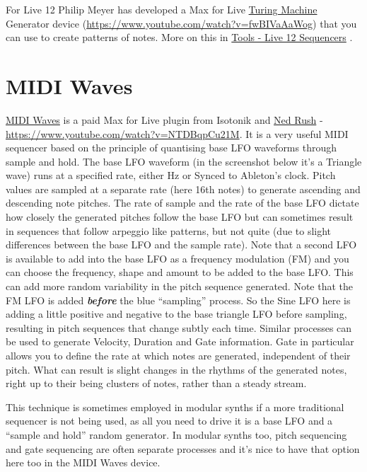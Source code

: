 \documentclass[
  12pt,
  letterpaper,
  oneside,
  open=any]{scrbook}
\makeatletter
\newcommand*\pandocbounded[1]{%
  \sbox\pandoc@box{#1}%
  \Gscale@div\@tempa{\textheight}{\dimexpr\ht\pandoc@box+\dp\pandoc@box\relax}%
  \Gscale@div\@tempb{\linewidth}{\wd\pandoc@box}%
  \ifdim\@tempb\p@<\@tempa\p@\let\@tempa\@tempb\fi%
  \ifdim\@tempa\p@<\p@\scalebox{\@tempa}{\usebox\pandoc@box}%
  \else\usebox{\pandoc@box}%
  \fi%
}
\makeatother
\begin{document}
\pandocbounded{\texttt{[image: images/Turing\_Machine.png]}}

For Live 12 Philip Meyer has developed a Max for Live
\href{https://isotonikstudios.com/product/turing-machine/?srsltid=AfmBOor_T0esjLa-jI_hMBqYTUuz_1TAYSXRbD5u_57BQk_dJ-Yr4ZTt}{Turing
Machine} Generator device
(\url{https://www.youtube.com/watch?v=fwBIVaAaWog}) that you can use to
create patterns of notes. More on this in
\hyperref[Chapter-031-Tools-Live12_Sequencers]{Tools - Live 12
Sequencers} .

\section{MIDI Waves}\label{midi-waves}

\href{https://isotonikstudios.com/product/midi-waves-by-ned-rush/}{MIDI
Waves} is a paid Max for Live plugin from Isotonik and
\href{https://www.youtube.com/@NedRush}{Ned Rush} -
\url{https://www.youtube.com/watch?v=NTDBqpCu21M}. It is a very useful
MIDI sequencer based on the principle of quantising base LFO waveforms
through sample and hold. The base LFO waveform (in the screenshot below
it's a Triangle wave) runs at a specified rate, either Hz or Synced to
Ableton's clock. Pitch values are sampled at a separate rate (here 16th
notes) to generate ascending and descending note pitches. The rate of
sample and the rate of the base LFO dictate how closely the generated
pitches follow the base LFO but can sometimes result in sequences that
follow arpeggio like patterns, but not quite (due to slight differences
between the base LFO and the sample rate). Note that a second LFO is
available to add into the base LFO as a frequency modulation (FM) and
you can choose the frequency, shape and amount to be added to the base
LFO. This can add more random variability in the pitch sequence
generated. Note that the FM LFO is added \textbf{\emph{before}} the blue
``sampling'' process. So the Sine LFO here is adding a little positive
and negative to the base triangle LFO before sampling, resulting in
pitch sequences that change subtly each time. Similar processes can be
used to generate Velocity, Duration and Gate information. Gate in
particular allows you to define the rate at which notes are generated,
independent of their pitch. What can result is slight changes in the
rhythms of the generated notes, right up to their being clusters of
notes, rather than a steady stream.

This technique is sometimes employed in modular synths if a more
traditional sequencer is not being used, as all you need to drive it is
a base LFO and a ``sample and hold'' random generator. In modular synths
too, pitch sequencing and gate sequencing are often separate processes
and it's nice to have that option here too in the MIDI Waves device.
\end{document}
